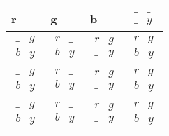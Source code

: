 \documentclass[a4paper]{article}
\begin{document}
\begin{tabular}{|l|l|l|l|}
\hline
r & g & b & $\begin{matrix}   \_ & \_ \\   \_ & y  \end{matrix}$ \\ \hline
$\begin{matrix}   \_ & g \\   b & y  \end{matrix}$ & $\begin{matrix}   r & \_ \\   b & y  \end{matrix}$ & $\begin{matrix}   r & g \\   \_ & y  \end{matrix}$ & $\begin{matrix}   r & g \\   b & y  \end{matrix}$ \\ \hline
$\begin{matrix}   \_ & g \\   b & y  \end{matrix}$ & $\begin{matrix}   r & \_ \\   b & y  \end{matrix}$ & $\begin{matrix}   r & g \\   \_ & y  \end{matrix}$ & $\begin{matrix}   r & g \\   b & y  \end{matrix}$ \\ \hline
$\begin{matrix}   \_ & g \\   b & y  \end{matrix}$ & $\begin{matrix}   r & \_ \\   b & y  \end{matrix}$ & $\begin{matrix}   r & g \\   \_ & y  \end{matrix}$ & $\begin{matrix}   r & g \\   b & y  \end{matrix}$ \\ \hline
\end{tabular}\\\\
\end{document}
